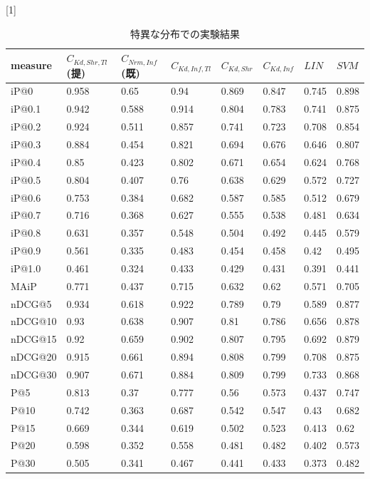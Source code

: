 \begin{table}[h]
  \caption{特異な分布での実験結果} 
  \label{tbl:resultUshape}
  \begin{center} {
\scalebox{0.9}[1]{
    \begin{tabular}{|l|l|l|lllll|}\hline
measure&$C_{Kd,Shr,Tl}$(提)&$C_{Nrm,Inf}$(既)&$C_{Kd,Inf,Tl}$&$C_{Kd,Shr}$&$C_{Kd,Inf}$&$LIN$&$SVM$\\ \hline
iP@0&0.958&0.65&0.94&0.869&0.847&0.745&0.898\\
iP@0.1&0.942&0.588&0.914&0.804&0.783&0.741&0.875\\
iP@0.2&0.924&0.511&0.857&0.741&0.723&0.708&0.854\\
iP@0.3&0.884&0.454&0.821&0.694&0.676&0.646&0.807\\
iP@0.4&0.85&0.423&0.802&0.671&0.654&0.624&0.768\\
iP@0.5&0.804&0.407&0.76&0.638&0.629&0.572&0.727\\
iP@0.6&0.753&0.384&0.682&0.587&0.585&0.512&0.679\\
iP@0.7&0.716&0.368&0.627&0.555&0.538&0.481&0.634\\
iP@0.8&0.631&0.357&0.548&0.504&0.492&0.445&0.579\\
iP@0.9&0.561&0.335&0.483&0.454&0.458&0.42&0.495\\
iP@1.0&0.461&0.324&0.433&0.429&0.431&0.391&0.441\\ \hline
MAiP&0.771&0.437&0.715&0.632&0.62&0.571&0.705\\ \hline
nDCG@5&0.934&0.618&0.922&0.789&0.79&0.589&0.877\\
nDCG@10&0.93&0.638&0.907&0.81&0.786&0.656&0.878\\
nDCG@15&0.92&0.659&0.902&0.807&0.795&0.692&0.879\\
nDCG@20&0.915&0.661&0.894&0.808&0.799&0.708&0.875\\
nDCG@30&0.907&0.671&0.884&0.809&0.799&0.733&0.868\\ \hline
P@5&0.813&0.37&0.777&0.56&0.573&0.437&0.747\\
P@10&0.742&0.363&0.687&0.542&0.547&0.43&0.682\\
P@15&0.669&0.344&0.619&0.502&0.523&0.413&0.62\\
P@20&0.598&0.352&0.558&0.481&0.482&0.402&0.573\\
P@30&0.505&0.341&0.467&0.441&0.433&0.373&0.482\\ \hline
\end{tabular}
  }
    }
  \end{center}
\end{table}
\clearpage

